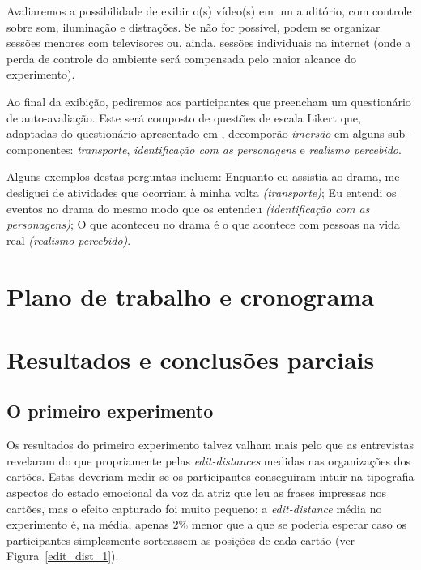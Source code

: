 \documentclass[a4paper]{tufte-handout}
\newcommand{\textls}[2][5]{%
    \begingroup\addfontfeatures{LetterSpace=#1}#2\endgroup
  }
\renewcommand{\smallcapsspacing}[1]{\textls[10]{#1}}
\renewcommand{\textsc}[1]{\smallcapsspacing{\textsmallcaps{#1}}}
\begin{document}
Avaliaremos a possibilidade de exibir o(s) vídeo(s) em um auditório, com controle sobre som, iluminação e distrações. Se não for possível, podem se organizar sessões menores com televisores ou, ainda, sessões individuais na internet (onde a perda de controle do ambiente será compensada pelo maior alcance do experimento).

Ao final da exibição, pediremos aos participantes que preencham um questionário de auto-avaliação. Este será composto de questões de escala Likert que, adaptadas do questionário apresentado em \citet{Kruger2016}, decomporão \textit{imersão} em alguns sub-componentes: \textit{transporte}, \textit{identificação com as personagens} e \textit{realismo percebido}.

Alguns exemplos destas perguntas incluem: Enquanto eu assistia ao drama, me desliguei de atividades que ocorriam à minha volta \textit{(transporte)}; Eu entendi os eventos no drama do mesmo modo que \textsc{xxx} os entendeu \textit{(identificação com as personagens)}; O que aconteceu no drama é o que acontece com pessoas na vida real \textit{(realismo percebido)}.



\section{Plano de trabalho e cronograma}\label{sec:plano_de_trabalho}

\section{Resultados e conclusões parciais}\label{sec:resultados}

\subsection{O primeiro experimento}\label{result_prim_exp}

Os resultados do primeiro experimento talvez valham mais pelo que as entrevistas revelaram do que propriamente pelas \textit{edit-distances} medidas nas organizações dos cartões. Estas deveriam medir se os participantes conseguiram intuir na tipografia aspectos do estado emocional da voz da atriz que leu  as frases impressas nos cartões, mas o efeito capturado foi muito pequeno: a \textit{edit-distance} média no experimento é, na média, apenas 2\% menor que a que se poderia esperar caso os participantes simplesmente sorteassem as posições de cada cartão (ver Figura~\ref{edit_dist_1}).
\end{document}
